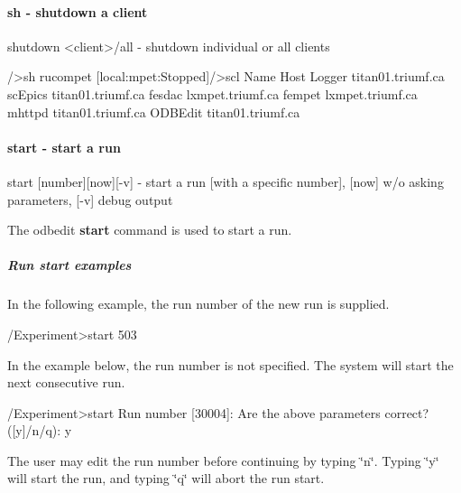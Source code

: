 \hypertarget{RC_odbedit_examples_RC_odbedit_sh}{}\paragraph{sh -\/ shutdown a client}\label{RC_odbedit_examples_RC_odbedit_sh}

\begin{DoxyCode}
shutdown <client>/all   - shutdown individual or all clients
\end{DoxyCode}
 \par
 
\begin{DoxyCode}
/>sh rucompet
[local:mpet:Stopped]/>scl
Name                Host
Logger              titan01.triumf.ca
scEpics             titan01.triumf.ca
fesdac              lxmpet.triumf.ca
fempet              lxmpet.triumf.ca
mhttpd              titan01.triumf.ca
ODBEdit             titan01.triumf.ca
\end{DoxyCode}


\label{RC_odbedit_examples_idx_run_start}
\hypertarget{RC_odbedit_examples_idx_run_start}{}
 

\hypertarget{RC_odbedit_examples_RC_odbedit_start}{}\paragraph{start -\/ start a run}\label{RC_odbedit_examples_RC_odbedit_start}

\begin{DoxyCode}
start [number][now][-v] - start a run [with a specific number],
                          [now] w/o asking parameters, [-v] debug output
\end{DoxyCode}
 \par


The odbedit {\bfseries start} command is used to start a run.

\par
 \hypertarget{RC_odbedit_examples_RC_EOS_example1}{}\subparagraph{Run start examples}\label{RC_odbedit_examples_RC_EOS_example1}
In the following example, the run number of the new run is supplied. 
\begin{DoxyCode}
/Experiment>start 503
\end{DoxyCode}
 \par


In the example below, the run number is not specified. The system will start the next consecutive run. 
\begin{DoxyCode}
/Experiment>start
Run number [30004]: 
Are the above parameters correct? ([y]/n/q): y
\end{DoxyCode}
 The user may edit the run number before continuing by typing \char`\"{}n\char`\"{}. Typing \char`\"{}y\char`\"{} will start the run, and typing \char`\"{}q\char`\"{} will abort the run start. \par


